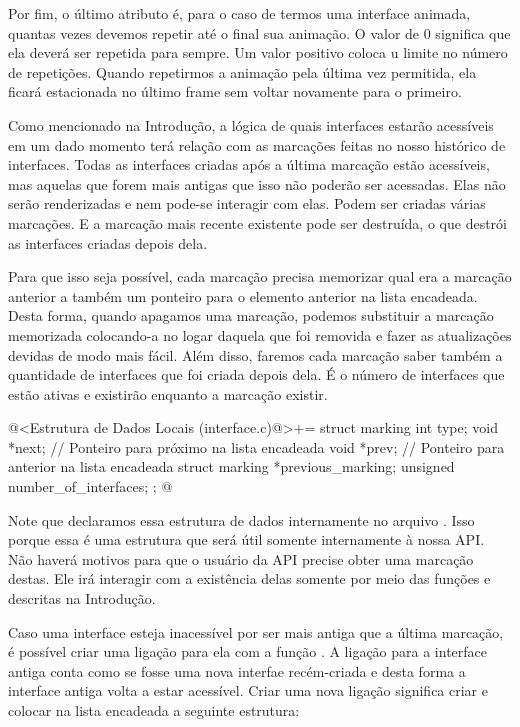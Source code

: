 Por fim, o último atributo é, para o caso de termos uma interface
animada, quantas vezes devemos repetir até o final sua animação. O
valor de 0 significa que ela deverá ser repetida para sempre. Um valor
positivo coloca u limite no número de repetições. Quando repetirmos a
animação pela última vez permitida, ela ficará estacionada no último
frame sem voltar novamente para o primeiro.


Como mencionado na Introdução, a lógica de quais interfaces estarão
acessíveis em um dado momento terá relação com as marcações feitas no
nosso histórico de interfaces. Todas as interfaces criadas após a
última marcação estão acessíveis, mas aquelas que forem mais antigas
que isso não poderão ser acessadas. Elas não serão renderizadas e
nem pode-se interagir com elas. Podem ser criadas várias marcações. E
a marcação mais recente existente pode ser destruída, o que destrói
as interfaces criadas depois dela.

Para que isso seja possível, cada marcação precisa memorizar qual era
a marcação anterior a também um ponteiro para o elemento anterior na
lista encadeada. Desta forma, quando apagamos uma marcação, podemos
substituir a marcação memorizada colocando-a no logar daquela que foi
removida e fazer as atualizações devidas de modo mais fácil. Além
disso, faremos cada marcação saber também a quantidade de interfaces
que foi criada depois dela. É o número de interfaces que estão ativas
e existirão enquanto a marcação existir.

\iniciocodigo
@<Estrutura de Dados Locais (interface.c)@>+=
struct marking {
  int type;
  void *next; // Ponteiro para próximo na lista encadeada
  void *prev; // Ponteiro para anterior na lista encadeada
  struct marking *previous_marking;
  unsigned number_of_interfaces;
};
@
\fimcodigo

Note que declaramos essa estrutura de dados internamente no arquivo
. Isso porque essa é uma estrutura que será
útil somente internamente à nossa API. Não haverá motivos para que o
usuário da API precise obter uma marcação destas. Ele irá interagir
com a existência delas somente por meio das funções
 e
 descritas na Introdução.


Caso uma interface esteja inacessível por ser mais antiga que a última
marcação, é possível criar uma ligação para ela com a função
. A ligação para a interface antiga
conta como se fosse uma nova interfae recém-criada e desta forma a
interface antiga volta a estar acessível. Criar uma nova ligação
significa criar e colocar na lista encadeada a seguinte estrutura:

